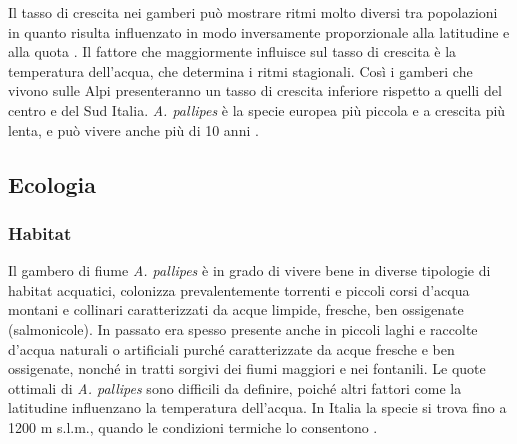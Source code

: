\documentclass[11pt,a4paper,italian,twoside,openany]{memoir}
\begin{document}
Il tasso di crescita nei gamberi può mostrare ritmi molto diversi tra popolazioni \cite{Lowery 1988} in quanto risulta influenzato in modo inversamente proporzionale alla latitudine e alla quota \cite{Vogt 2012} \cite{Scalici 2008}. Il fattore che maggiormente influisce sul tasso di crescita è la temperatura dell'acqua, che determina i ritmi stagionali. Così i gamberi che vivono sulle Alpi presenteranno un tasso di crescita inferiore rispetto a quelli del centro e del Sud Italia. \emph{A. pallipes} è la specie europea più piccola e a crescita più lenta, e può vivere anche più di 10 anni \cite{Kouba 2015}.

\subsection{Ecologia}
\subsubsection{Habitat} 
\label{subsub_hab}
Il gambero di fiume \emph{A. pallipes} è in grado di vivere bene in diverse tipologie di habitat acquatici, colonizza prevalentemente torrenti e piccoli corsi d'acqua montani e collinari caratterizzati da acque limpide, fresche, ben ossigenate (salmonicole). In passato era spesso presente anche in piccoli laghi e raccolte d'acqua naturali o artificiali purché caratterizzate da acque fresche e ben ossigenate, nonché in tratti sorgivi dei fiumi maggiori e nei fontanili. Le quote ottimali di \emph{A. pallipes} sono difficili da definire, poiché altri fattori come la latitudine influenzano la temperatura dell'acqua. In Italia la specie si trova fino a 1200 m s.l.m., quando le condizioni termiche lo consentono \cite{Endrizzi 2013}.
\end{document}
